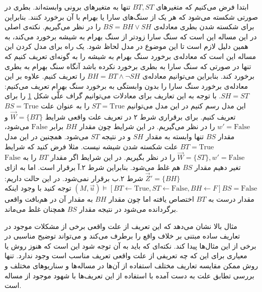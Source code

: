 \documentclass[
msc,
irfonts
]{./tex/tehran-thesis}
\newcommand{\پ}{پروژه/پایان‌نامه/رساله }
\theoremstyle{definition}
\theoremstyle{theorem}
\theoremstyle{definition}
\numberwithin{algorithm}{chapter}
\newcommand{\F}{\mathrm{False}}
\newcommand{\T}{\mathrm{True}}
\newcommand{\s}[1]{\{#1\}}
\newcommand{\la}{\leftarrow}
\begin{document}
\begin{figure}
      \centering
      \caption{}
      \label{fig:hp:sb}
\end{figure}
ابتدا فرض می‌کنیم که متغیر‌های
$BT,ST$
تنها به متغیر‌های برونی وابسته‌اند.
بطری در صورتی شکسته می‌شود که هر یک از سنگ‌های سارا یا بهرام با آن برخورد کنند.
بنابراین برای شکسته شدن بطری معادله‌ی
$BS = BH \vee SH$
را در نظر می‌گیریم.
نکته‌ی اصلی در این مساله این است که سنگ سارا زودتر از سنگ بهرام به شیشه برخورد می‌کند، به همین دلیل لازم است تا این موضوع در مدل لحاظ شود.
یک راه برای مدل کردن این مساله این است که معادله‌ی برخورد سنگ بهرام به شیشه را به گونه‌ای تعریف کنیم که تنها در صورتی که سنگ سارا به بطری برخورد نکرده باشد آنگاه سنگ بهرام به بطری برخورد کند.
بنابراین می‌توانیم معادله‌ی
$BH = BT \wedge \neg SH$
را تعریف کنیم.
علاوه بر این معادله‌ی برخورد سنگ سارا را بدون وابستگی به برخورد سنگ بهرام تعریف می‌کنیم:
$SH = ST$.
با توجه به این تعاریف برای معادلات می‌توانیم گراف علّی شکل
\ref{fig:hp:sb}
را برای این مدل رسم کنیم
در این مدل می‌توانیم
$ST = \T$
را به عنوان علت
$BS = \T$
تعریف کنیم.
برای برقراری شرط ۲ در تعریف علت واقعی شرایط
$\vec W = \s{BT}$
و
$w' = \F$
را در نظر می‌گیریم.
در این شرایط چون مقدار
$BH$
برابر
$\F$
می‌شود، مقدار
$BS$
تنها وابسته به مقدار
$SH$
و در نتیجه
$ST$
می‌شود.
همچنین در این مدل
$BT = \T$
علت شکسته شدن شیشه نیست.
مثلا فرض کنید که شرایط
$\vec W = \s{ST},w' = \F$
را در نظر بگیریم.
در این شرایط اگر مقدار
$BT$
را به
$\F$
تغیر دهیم مقدار
$BS$
هم غلط می‌شود.
بنابراین شرط ۲.آ برقرار است.
اما به ازای
$\vec Z' = \s{BH}$
شرط ۲.ب برقرار نمی‌شود.
در این حالت داریم:
$(M,\vec{u})\vDash[BT \la \T,ST \la \F,BH \la F]BS = \F$
توجه کنید با وجود اینکه مقدار درست به
$BT$
اختصاص یافته اما چون مقدار
$BH$
به مقدار آن در هم‌بافت واقعی برگردانده می‌شود در نتیجه مقدار
$BS$
همچنان غلط می‌ماند.

مثال بالا نشان می‌دهد که این تعریف از علت واقعی برخی از مشکلات موجود در تعاریف ساده مبتنی بر خلاف واقع را برطرف می‌کند و می‌تواند توضیح مناسبی در برخی از این مثال‌ها پیدا کند.
نکته‌ای که باید به آن توجه شود این است که هنوز روش یا معیاری برای این که چه تعریفی از علت واقعی تعریف مناسب است وجود ندارد.
تنها روش ممکن مقایسه تعاریف مختلف استفاده از آن‌ها در مساله‌ها و سناریوهای مختلف و بررسی تطابق علت به دست آمده با استفاده از این تعریف‌ها با شهود موجود از مساله است.
\end{document}
